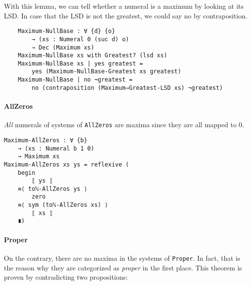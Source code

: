 \documentclass[\main/thesis.tex]{subfiles}
\begin{document}
With this lemma, we can tell whether a numeral is a maximum by looking at its
LSD. In case that the LSD is not the greatest, we could say no by contraposition.

\begin{lstlisting}
    Maximum-NullBase : ∀ {d} {o}
        → (xs : Numeral 0 (suc d) o)
        → Dec (Maximum xs)
    Maximum-NullBase xs with Greatest? (lsd xs)
    Maximum-NullBase xs | yes greatest =
        yes (Maximum-NullBase-Greatest xs greatest)
    Maximum-NullBase | no ¬greatest =
        no (contraposition (Maximum⇒Greatest-LSD xs) ¬greatest)
\end{lstlisting}

\paragraph{AllZeros}

\begin{center}
\end{center}

\textit{All} numerals of systems of {\lstinline|AllZeros|} are maxima
since they are all mapped to $ 0 $.

\begin{lstlisting}
Maximum-AllZeros : ∀ {b}
    → (xs : Numeral b 1 0)
    → Maximum xs
Maximum-AllZeros xs ys = reflexive (
    begin
        ⟦ ys ⟧
    ≡⟨ toℕ-AllZeros ys ⟩
        zero
    ≡⟨ sym (toℕ-AllZeros xs) ⟩
        ⟦ xs ⟧
    ∎)
\end{lstlisting}

\paragraph{Proper}

On the contrary, there are no maxima in the systems of {\lstinline|Proper|}.
In fact, that is the reason why they are categorized as \textit{proper} in the
first place. This theorem is proven by contradicting two propositions:
\end{document}
